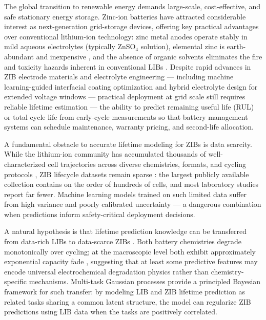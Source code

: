 \documentclass[12pt]{article}
\begin{document}
The global transition to renewable energy demands large-scale, cost-effective,
and safe stationary energy storage. Zinc-ion batteries have attracted considerable
interest as next-generation grid-storage devices, offering key practical
advantages over conventional lithium-ion technology: zinc metal anodes operate
stably in mild aqueous electrolytes (typically ZnSO$_4$ solution), elemental
zinc is earth-abundant and inexpensive \cite{kundu2016zinc, parker2017zinc}, and the absence of organic solvents
eliminates the fire and toxicity hazards inherent in conventional LIBs
\cite{tan2024}. Despite rapid advances in ZIB electrode materials and
electrolyte engineering --- including machine learning-guided interfacial
coating optimization \cite{song2026ald} and hybrid electrolyte design for extended voltage windows \cite{song2021awis} --- practical deployment at grid scale
still requires reliable lifetime estimation \cite{zhi2020zib} --- the ability to predict remaining useful life
(RUL) or total cycle life from early-cycle measurements so that battery
management systems can schedule maintenance, warranty pricing, and second-life
allocation.

A fundamental obstacle to accurate lifetime modeling for ZIBs is data
scarcity. While the lithium-ion community has accumulated thousands of
well-characterized cell trajectories across diverse chemistries, formats, and
cycling protocols \cite{severson2019, paulson2022, roman2021, fermin2020knee, zhu2020tincone}, ZIB lifecycle datasets
remain sparse \cite{ma2020mnO2}: the largest publicly available collection contains on the order
of hundreds of cells, and most laboratory studies report far fewer. Machine
learning models trained on such limited data \cite{attia2020closed, fermin2020knee} suffer from high variance and
poorly calibrated uncertainty --- a dangerous combination when predictions
inform safety-critical deployment decisions.

A natural hypothesis is that lifetime prediction knowledge can be transferred
from data-rich LIBs to data-scarce ZIBs \cite{pan2010transfer, weiss2016transfer, wang2021soh}. Both battery chemistries degrade
monotonically over cycling; at the macroscopic level both exhibit
approximately exponential capacity fade \cite{vetter2005ageing, birkl2017degradation}, suggesting that at least some
predictive features may encode universal electrochemical degradation physics
rather than chemistry-specific mechanisms. Multi-task Gaussian processes
\cite{bonilla2007, alvarez2012kernels} provide a principled Bayesian framework for such transfer:
by modeling LIB and ZIB lifetime prediction as related tasks sharing a common
latent structure, the model can regularize ZIB predictions using LIB data when
the tasks are positively correlated.
\end{document}
